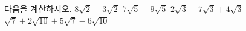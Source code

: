 다음을 계산하시오.
 $8\sqrt{2}+3\sqrt{2}$
 $7\sqrt{5}-9\sqrt{5}$
 $2\sqrt{3}-7\sqrt{3}+4\sqrt{3}$
 $\sqrt{7}+2\sqrt{10}+5\sqrt{7}-6\sqrt{10}$

